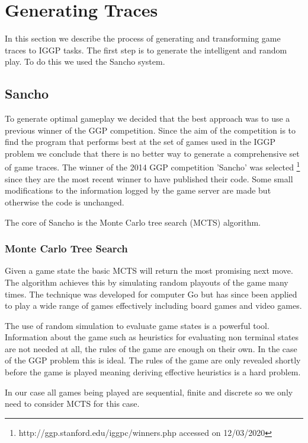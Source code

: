 \chapter{Generating Traces}\label{ch:traces}
In this section we describe the process of generating and transforming game traces to IGGP tasks. The first step is to generate the intelligent and random play. To do this we used the Sancho system. 

\section{Sancho}
To generate optimal gameplay we decided that the best approach was to use a previous winner of the GGP competition. Since the aim of the competition is to find the program that performs best at the set of games used in the IGGP problem we conclude that there is no better way to generate a comprehensive set of game traces. The winner of the 2014 GGP competition 'Sancho' was selected \footnote{http://ggp.stanford.edu/iggpc/winners.php accessed on 12/03/2020} since they are the most recent winner to have published their code\cite{Sancho/Github}. Some small modifications to the information logged by the game server are made but otherwise the code is unchanged.

The core of Sancho is the Monte Carlo tree search (MCTS) algorithm.

\subsection{Monte Carlo Tree Search}
Given a game state the basic MCTS will return the most promising next move. The algorithm achieves this by simulating random playouts of the game many times. The technique was developed for computer Go but has since been applied to play a wide range of games effectively including board games and video games\cite{Silver/MCTS}\cite{Chaslot/MCTS}.

The use of random simulation to evaluate game states is a powerful tool. Information about the game such as heuristics for evaluating non terminal states are not needed at all, the rules of the game are enough on their own. In the case of the GGP problem this is ideal. The rules of the game are only revealed shortly before the game is played meaning deriving effective heuristics is a hard problem.

In our case all games being played are sequential, finite and discrete so we only need to consider MCTS for this case.

